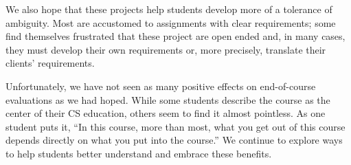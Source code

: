 We also hope that these projects help students develop more of a
tolerance of ambiguity.  Most are accustomed to assignments with
clear requirements; some find themselves frustrated that these 
project are open ended and, in many cases, they must develop
their own requirements or, more precisely, translate their clients'
requirements.

Unfortunately, we have not seen as many positive effects on
end-of-course evaluations as we had hoped.  While some students
describe the course as the center of their CS education, others
seem to find it almost pointless.  As one student puts it, ``In this course,
more than most, what you get out of this course depends directly
on what you put into the course.''  We continue to explore ways to
help students better understand and embrace these benefits.

